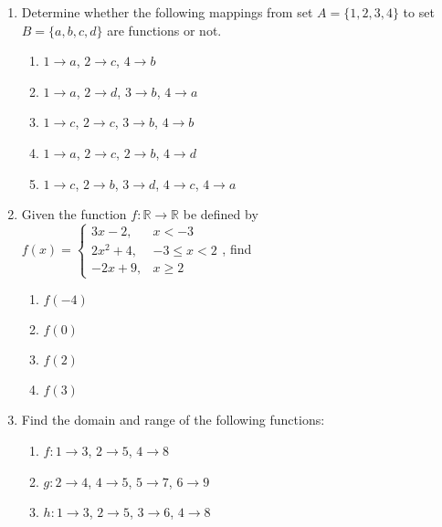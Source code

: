 \documentclass[12pt]{report}
\begin{document}
\begin{multicols}{2}
  \begin{enumerate}
    \item Determine whether the following mappings from set $A = \{1, 2, 3, 4\}$ to set
          $B = \{a, b, c, d\}$ are functions or not.
          \begin{enumerate}
            \item $1 \to a$, $2 \to c$, $4 \to b$
            \item $1 \to a$, $2 \to d$, $3 \to b$, $4 \to a$
            \item $1 \to c$, $2 \to c$, $3 \to b$, $4 \to b$
            \item $1 \to a$, $2 \to c$, $2 \to b$, $4 \to d$
            \item $1 \to c$, $2 \to b$, $3 \to d$, $4 \to c$, $4 \to a$
          \end{enumerate}

    \item Given the function $f: \mathbb{R} \to \mathbb{R}$ be defined by $f(x) = \left\{\begin{array}{rl}
              3x - 2,   & x < -3        \\
              2x^2 + 4, & -3 \leq x < 2 \\
              -2x + 9,  & x \geq 2
            \end{array}\right.$, find
          \begin{enumerate}
            \item $f(-4)$
            \item $f(0)$
            \item $f(2)$
            \item $f(3)$
          \end{enumerate}

    \item Find the domain and range of the following functions:
          \begin{enumerate}
            \item $f: 1 \to 3$, $2 \to 5$, $4 \to 8$
            \item $g: 2 \to 4$, $4 \to 5$, $5 \to 7$, $6 \to 9$
            \item $h: 1 \to 3$, $2 \to 5$, $3 \to 6$, $4 \to 8$
          \end{enumerate}


\end{enumerate}
\end{multicols}
\end{document}
